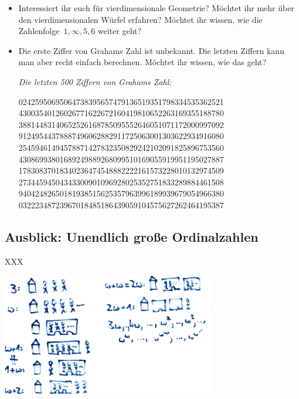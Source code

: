 \documentclass{../../zirkelblatt1718}
\theoremstyle{definition}
\theoremstyle{plain}
\theoremstyle{remark}
\begin{document}
\begin{itemize}
  \item Interessiert ihr euch für vierdimensionale Geometrie? Möchtet ihr mehr
  über den vierdimensionalen Würfel erfahren? Möchtet ihr wissen, wie die
  Zahlenfolge~$1, \infty, 5, 6$ weiter geht?
  \item Die erste Ziffer von Grahams Zahl ist unbekannt. Die letzten Ziffern
  kann man aber recht einfach berechnen. Möchtet ihr wissen, wie das geht?
\begin{center}
\emph{Die letzten 500 Ziffern von Grahams Zahl:}

02425950695064738395657479136519351798334535362521 \\
43003540126026771622672160419810652263169355188780 \\
38814483140652526168785095552646051071172000997092 \\
91249544378887496062882911725063001303622934916080 \\
25459461494578871427832350829242102091825896753560 \\
43086993801689249889268099510169055919951195027887 \\
17830837018340236474548882222161573228010132974509 \\
27344594504343300901096928025352751833289884461508 \\
94042482650181938515625357963996189939679054966380 \\
03222348723967018485186439059104575627262464195387
\par
\end{center}
\end{itemize}


\subsection{Ausblick: Unendlich große Ordinalzahlen}

XXX

\begin{center}
  \includegraphics[width=0.7\textwidth]{ordinal-intuition}
\end{center}
\end{document}
